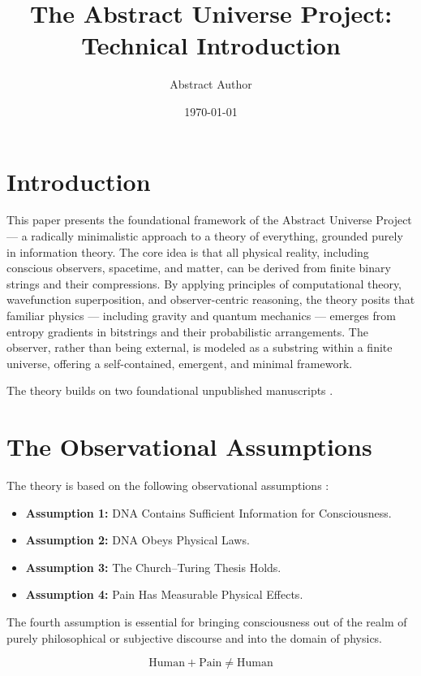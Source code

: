 \documentclass[11pt]{article}
\title{The Abstract Universe Project: Technical Introduction}
\author{Abstract Author}
\date{\today}
\begin{document}
\maketitle

\section{Introduction}

This paper presents the foundational framework of the Abstract Universe Project — a radically minimalistic approach to a theory of everything, grounded purely in information theory. The core idea is that all physical reality, including conscious observers, spacetime, and matter, can be derived from finite binary strings and their compressions. By applying principles of computational theory, wavefunction superposition, and observer-centric reasoning, the theory posits that familiar physics — including gravity and quantum mechanics — emerges from entropy gradients in bitstrings and their probabilistic arrangements. The observer, rather than being external, is modeled as a substring within a finite universe, offering a self-contained, emergent, and minimal framework.

The theory builds on two foundational unpublished manuscripts \cite{meskanen2019, meskanen2020}.

\section{The Observational Assumptions}

The theory is based on the following observational assumptions \cite{meskanen2019}:

\begin{itemize}
      \item \textbf{Assumption 1:} DNA Contains Sufficient Information for Consciousness.
      \item \textbf{Assumption 2:} DNA Obeys Physical Laws.
      \item \textbf{Assumption 3:} The Church–Turing Thesis Holds.
      \item \textbf{Assumption 4:} Pain Has Measurable Physical Effects.
\end{itemize}

The fourth assumption is essential for bringing consciousness out of the realm of purely philosophical or subjective discourse and into the domain of physics.

\[
      \text{Human} + \text{Pain} \neq \text{Human}
\]
\end{document}
